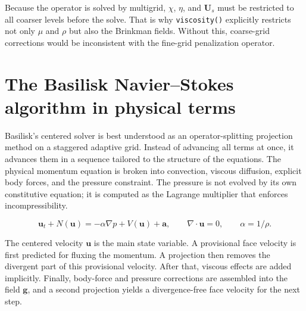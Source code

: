 \documentclass[11pt,a4paper]{article}
\begin{document}
Because the operator is solved by multigrid, $\chi$, $\eta$, and $\bm{U}_s$ must be restricted to all coarser levels before the solve. That is why \texttt{viscosity()} explicitly restricts not only $\mu$ and $\rho$ but also the Brinkman fields. Without this, coarse-grid corrections would be inconsistent with the fine-grid penalization operator.

\section{The Basilisk Navier--Stokes algorithm in physical terms}

Basilisk's centered solver is best understood as an operator-splitting projection method on a staggered adaptive grid. Instead of advancing all terms at once, it advances them in a sequence tailored to the structure of the equations. The physical momentum equation is broken into convection, viscous diffusion, explicit body forces, and the pressure constraint. The pressure is not evolved by its own constitutive equation; it is computed as the Lagrange multiplier that enforces incompressibility.

\begin{equation}
\bm{u}_t + N(\bm{u}) = -\alpha\nabla p + V(\bm{u}) + \bm{a}, \qquad \nabla\cdot\bm{u}=0, \qquad \alpha = 1/\rho.
\end{equation}

The centered velocity $\bm{u}$ is the main state variable. A provisional face velocity is first predicted for fluxing the momentum. A projection then removes the divergent part of this provisional velocity. After that, viscous effects are added implicitly. Finally, body-force and pressure corrections are assembled into the field $\bm{g}$, and a second projection yields a divergence-free face velocity for the next step.
\end{document}
